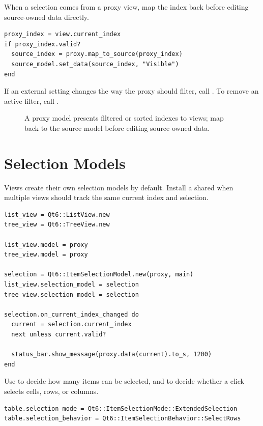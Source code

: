 When a selection comes from a proxy view, map the index back before editing source-owned data directly.

\begin{lstlisting}[style=crystal]
proxy_index = view.current_index
if proxy_index.valid?
  source_index = proxy.map_to_source(proxy_index)
  source_model.set_data(source_index, "Visible")
end
\end{lstlisting}

If an external setting changes the way the proxy should filter, call . To remove an active filter, call .

\begin{figure}[htbp]
  \centering
  \caption{A proxy model presents filtered or sorted indexes to views; map back to the source model before editing source-owned data.}
\end{figure}

\section{Selection Models}

Views create their own selection models by default. Install a shared  when multiple views should track the same current index and selection.

\begin{lstlisting}[style=crystal]
list_view = Qt6::ListView.new
tree_view = Qt6::TreeView.new

list_view.model = proxy
tree_view.model = proxy

selection = Qt6::ItemSelectionModel.new(proxy, main)
list_view.selection_model = selection
tree_view.selection_model = selection

selection.on_current_index_changed do
  current = selection.current_index
  next unless current.valid?

  status_bar.show_message(proxy.data(current).to_s, 1200)
end
\end{lstlisting}

Use  to decide how many items can be selected, and  to decide whether a click selects cells, rows, or columns.

\begin{lstlisting}[style=crystal]
table.selection_mode = Qt6::ItemSelectionMode::ExtendedSelection
table.selection_behavior = Qt6::ItemSelectionBehavior::SelectRows
\end{lstlisting}

